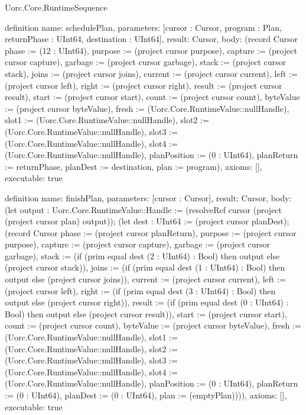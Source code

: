 \begin{lexlean}{Uorc.Core.RuntimeSequence}
\begin{semanticmodule}
definition{
  name: schedulePlan,
  parameters: [cursor : Cursor, program : Plan, returnPhase : UInt64, destination : UInt64],
  result: Cursor,
  body: (record Cursor {phase := (12 : UInt64), purpose := (project cursor purpose), capture := (project cursor capture), garbage := (project cursor garbage), stack := (project cursor stack), joins := (project cursor joins), current := (project cursor current), left := (project cursor left), right := (project cursor right), result := (project cursor result), start := (project cursor start), count := (project cursor count), byteValue := (project cursor byteValue), fresh := (Uorc.Core.RuntimeValue::nullHandle), slot1 := (Uorc.Core.RuntimeValue::nullHandle), slot2 := (Uorc.Core.RuntimeValue::nullHandle), slot3 := (Uorc.Core.RuntimeValue::nullHandle), slot4 := (Uorc.Core.RuntimeValue::nullHandle), planPosition := (0 : UInt64), planReturn := returnPhase, planDest := destination, plan := program}),
  axioms: [],
  executable: true
}

definition{
  name: finishPlan,
  parameters: [cursor : Cursor],
  result: Cursor,
  body: (let output : Uorc.Core.RuntimeValue::Handle := (resolveRef cursor (project (project cursor plan) output)); (let dest : UInt64 := (project cursor planDest); (record Cursor {phase := (project cursor planReturn), purpose := (project cursor purpose), capture := (project cursor capture), garbage := (project cursor garbage), stack := (if (prim equal dest (2 : UInt64) : Bool) then output else (project cursor stack)), joins := (if (prim equal dest (1 : UInt64) : Bool) then output else (project cursor joins)), current := (project cursor current), left := (project cursor left), right := (if (prim equal dest (3 : UInt64) : Bool) then output else (project cursor right)), result := (if (prim equal dest (0 : UInt64) : Bool) then output else (project cursor result)), start := (project cursor start), count := (project cursor count), byteValue := (project cursor byteValue), fresh := (Uorc.Core.RuntimeValue::nullHandle), slot1 := (Uorc.Core.RuntimeValue::nullHandle), slot2 := (Uorc.Core.RuntimeValue::nullHandle), slot3 := (Uorc.Core.RuntimeValue::nullHandle), slot4 := (Uorc.Core.RuntimeValue::nullHandle), planPosition := (0 : UInt64), planReturn := (0 : UInt64), planDest := (0 : UInt64), plan := (emptyPlan)}))),
  axioms: [],
  executable: true
}


\end{semanticmodule}
\end{lexlean}
